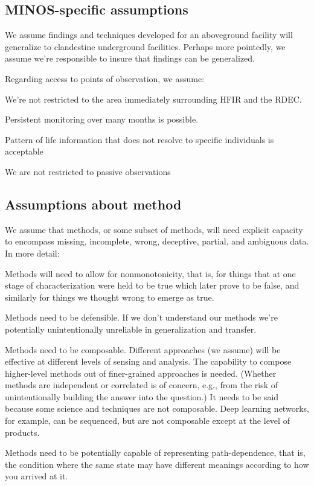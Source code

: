 \documentclass{article} %
\begin{document}
\subsection{MINOS-specific assumptions}
We assume findings and techniques developed for an aboveground facility will generalize to clandestine underground facilities. Perhaps more pointedly, we assume we're responsible to insure that findings can be generalized.

Regarding access to points of observation, we assume:
\begin{itemize*}
\item We're not restricted to the area immediately surrounding HFIR and the RDEC.
\item Persistent monitoring over many months is possible.
\item Pattern of life information that does not resolve to specific individuals is acceptable
\item We are not restricted to passive observations
\end{itemize*}

\subsection{Assumptions about method}
We assume that methods, or some subset of methods, will need explicit capacity to encompass missing, incomplete, wrong, deceptive, partial, and ambiguous data. In more detail:
\begin{itemize*}
\item Methods will need to allow for nonmonotonicity, that is, for things that at one stage of characterization were held to be true which later prove to be false, and similarly for things we thought wrong to emerge as true.
\item Methods need to be defensible. If we don't understand our methods we're potentially unintentionally unreliable in generalization and transfer.
\item Methods need to be composable. Different approaches (we assume) will be effective at different levels of sensing and analysis. The capability to compose higher-level methods out of finer-grained approaches is needed. (Whether methods are independent or correlated is of concern, e.g., from the risk of unintentionally building the answer into the question.) It needs to be said because some science and techniques are not composable. Deep learning networks, for example, can be sequenced, but are not composable except at the level of products.
\item Methods need to be potentially capable of representing path-dependence, that is, the condition where the same state may have different meanings according to how you arrived at it. 
\end{itemize*}
\end{document}
